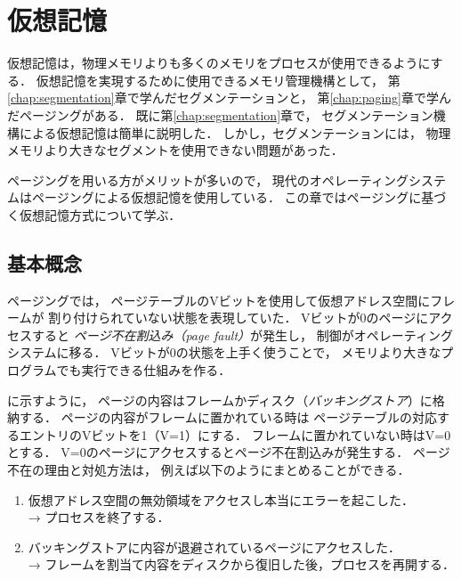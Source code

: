 \chapter{仮想記憶}
\label{virtualMemory}
仮想記憶は，物理メモリよりも多くのメモリをプロセスが使用できるようにする．
仮想記憶を実現するために使用できるメモリ管理機構として，
第\ref{chap:segmentation}章で学んだセグメンテーションと，
第\ref{chap:paging}章で学んだページングがある．
既に第\ref{chap:segmentation}章で，
セグメンテーション機構による仮想記憶は簡単に説明した．
しかし，セグメンテーションには，
物理メモリより大きなセグメントを使用できない問題があった．

ページングを用いる方がメリットが多いので，
現代のオペレーティングシステムはページングによる仮想記憶を使用している．
この章ではページングに基づく仮想記憶方式について学ぶ．

\section{基本概念}
ページングでは，
ページテーブルのVビットを使用して仮想アドレス空間にフレームが
割り付けられていない状態を表現していた．
Vビットが0のページにアクセスすると
\emph{ページ不在割込み（page fault）}が発生し，
制御がオペレーティングシステムに移る．
Vビットが0の状態を上手く使うことで，
メモリより大きなプログラムでも実行できる仕組みを作る．

に示すように，
ページの内容はフレームかディスク（\emph{バッキングストア}）に格納する．
ページの内容がフレームに置かれている時は
ページテーブルの対応するエントリのVビットを1（V=1）にする．
フレームに置かれていない時はV=0とする．
V=0のページにアクセスするとページ不在割込みが発生する．
ページ不在の理由と対処方法は，
例えば以下のようにまとめることができる．

\begin{enumerate}
\item 仮想アドレス空間の無効領域をアクセスし本当にエラーを起こした．\\
  → プロセスを終了する．
\item バッキングストアに内容が退避されているページにアクセスした．\\
  → フレームを割当て内容をディスクから復旧した後，プロセスを再開する．
\end{enumerate}

